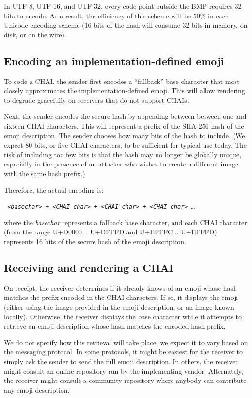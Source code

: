 \documentclass[12pt]{article}
\begin{document}
In UTF-8, UTF-16, and UTF-32, every code point outside the BMP
requires 32 bits to encode. As a result, the efficiency of
this scheme will be 50\% in each Unicode encoding scheme (16 bits of
the hash will consume 32 bits in memory, on disk, or on the wire).

\subsection{Encoding an implementation-defined emoji}

To code a CHAI, the sender first encodes a ``fallback'' base character
that most closely approximates the implementation-defined emoji. This
will allow rendering to degrade gracefully on receivers that do not
support CHAIs.

Next, the sender encodes the secure hash by appending between between
one and sixteen CHAI characters. This will represent a prefix of the
SHA-256 hash of the emoji description. The sender chooses how many
bits of the hash to include. (We expect 80 bits, or five CHAI
characters, to be sufficient for typical use today. The risk of
including too few bits is that the hash may no longer be globally unique,
especially in the presence of an attacker who wishes to create a different
image with the same hash prefix.)

Therefore, the actual encoding is:

\texttt { <\textit{basechar}> + <\textit{CHAI char}> + <\textit{CHAI char}> + <\textit{CHAI char}> \ldots }

where the \textit{basechar} represents a fallback base character, and
each CHAI character (from the range U+D0000 .. U+DFFFD and U+EFFFC
.. U+EFFFD) represents 16 bits of the secure hash of the emoji
description.

\subsection{Receiving and rendering a CHAI}

On receipt, the receiver determines if it already knows of an emoji
whose hash matches the prefix encoded in the CHAI characters. If so,
it displays the emoji (either using the image provided in the emoji
description, or an image known locally). Otherwise, the receiver
displays the base character while it attempts to retrieve an emoji
description whose hash matches the encoded hash prefix.

We do not specify how this retrieval will take place; we expect it to
vary based on the messaging protocol. In some protocols, it might be
easiest for the receiver to simply ask the sender to send the full
emoji description. In others, the receiver might consult an online
repository run by the implementing vendor. Alternately, the receiver
might consult a community repository where anybody can contribute any
emoji description.
\end{document}
